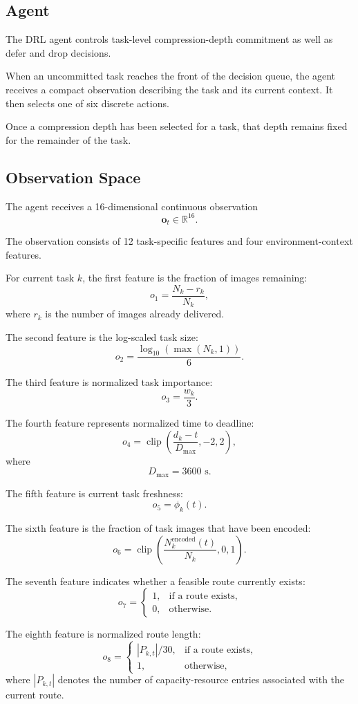\documentclass[11pt]{article}
\begin{document}
\subsection{Agent}

The DRL agent controls task-level compression-depth commitment as well as
defer and drop decisions.

When an uncommitted task reaches the front of the decision queue, the agent
receives a compact observation describing the task and its current context.
It then selects one of six discrete actions.

Once a compression depth has been selected for a task, that depth remains
fixed for the remainder of the task.


\subsection{Observation Space}

The agent receives a 16-dimensional continuous observation
\[
\mathbf{o}_t\in\mathbb{R}^{16}.
\]

The observation consists of 12 task-specific features and four
environment-context features.

For current task $k$, the first feature is the fraction of images remaining:
\[
o_1
=
\frac{N_k-r_k}{N_k},
\]
where $r_k$ is the number of images already delivered.

The second feature is the log-scaled task size:
\[
o_2
=
\frac{\log_{10}(\max(N_k,1))}{6}.
\]

The third feature is normalized task importance:
\[
o_3
=
\frac{w_k}{3}.
\]

The fourth feature represents normalized time to deadline:
\[
o_4
=
\operatorname{clip}
\left(
\frac{d_k-t}{D_{\max}},
-2,
2
\right),
\]
where
\[
D_{\max}=3600\text{ s}.
\]

The fifth feature is current task freshness:
\[
o_5=\phi_k(t).
\]

The sixth feature is the fraction of task images that have been encoded:
\[
o_6
=
\operatorname{clip}
\left(
\frac{N_k^{\mathrm{encoded}}(t)}{N_k},
0,
1
\right).
\]

The seventh feature indicates whether a feasible route currently exists:
\[
o_7
=
\begin{cases}
1, & \text{if a route exists},\\
0, & \text{otherwise}.
\end{cases}
\]

The eighth feature is normalized route length:
\[
o_8
=
\begin{cases}
|P_{k,t}|/30, & \text{if a route exists},\\
1, & \text{otherwise},
\end{cases}
\]
where $|P_{k,t}|$ denotes the number of capacity-resource entries associated
with the current route.
\end{document}
